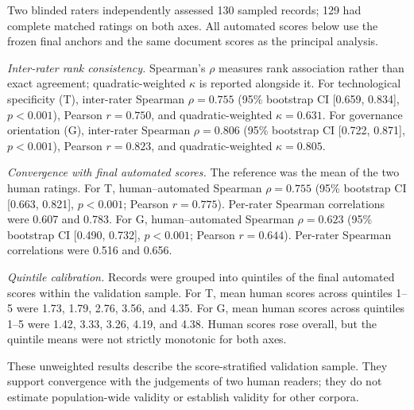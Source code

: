 Two blinded raters independently assessed 130 sampled records; 129 had complete matched ratings on both axes.
All automated scores below use the frozen final anchors and the same document scores as the principal analysis.

\textit{Inter-rater rank consistency.} Spearman's $\rho$ measures rank association rather than exact agreement; quadratic-weighted $\kappa$ is reported alongside it.
For technological specificity (T), inter-rater Spearman $\rho=0.755$ (95\% bootstrap CI [0.659, 0.834], $p<0.001$), Pearson $r=0.750$, and quadratic-weighted $\kappa=0.631$.
For governance orientation (G), inter-rater Spearman $\rho=0.806$ (95\% bootstrap CI [0.722, 0.871], $p<0.001$), Pearson $r=0.823$, and quadratic-weighted $\kappa=0.805$.

\textit{Convergence with final automated scores.} The reference was the mean of the two human ratings.
For T, human--automated Spearman $\rho=0.755$ (95\% bootstrap CI [0.663, 0.821], $p<0.001$; Pearson $r=0.775$). Per-rater Spearman correlations were 0.607 and 0.783.
For G, human--automated Spearman $\rho=0.623$ (95\% bootstrap CI [0.490, 0.732], $p<0.001$; Pearson $r=0.644$). Per-rater Spearman correlations were 0.516 and 0.656.

\textit{Quintile calibration.} Records were grouped into quintiles of the final automated scores within the validation sample.
For T, mean human scores across quintiles 1--5 were 1.73, 1.79, 2.76, 3.56, and 4.35.
For G, mean human scores across quintiles 1--5 were 1.42, 3.33, 3.26, 4.19, and 4.38.
Human scores rose overall, but the quintile means were not strictly monotonic for both axes.

These unweighted results describe the score-stratified validation sample. They support convergence with the judgements of two human readers; they do not estimate population-wide validity or establish validity for other corpora.
